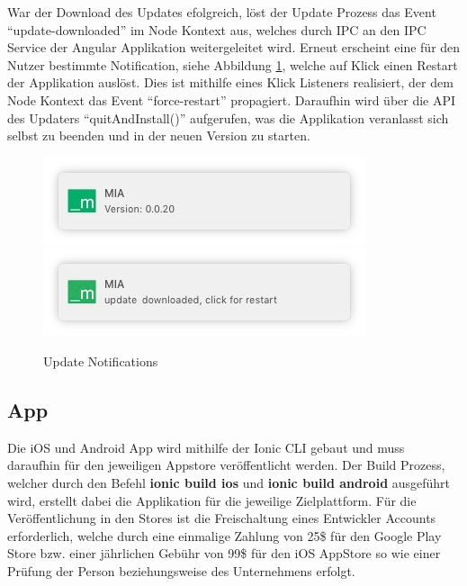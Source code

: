 War der Download des Updates efolgreich, löst der Update Prozess das Event ``update-downloaded'' im Node Kontext aus,
welches durch IPC an den IPC Service der Angular Applikation weitergeleitet wird. Erneut erscheint eine für den Nutzer bestimmte Notification, siehe Abbildung \ref{kapitel4/update-push}, welche auf Klick einen Restart der Applikation auslöst.
Dies ist mithilfe eines Klick Listeners realisiert, der dem Node Kontext das Event ``force-restart'' propagiert.
Daraufhin wird über die \ac{API} des Updaters ``quitAndInstall()'' aufgerufen, was die Applikation veranlasst sich selbst zu beenden und in der neuen Version zu starten.


\begin{figure}[h]
 \centering
  \includegraphics[width=0.5\linewidth]{kapitel4/version-push.jpg}
 \includegraphics[width=0.5\linewidth]{kapitel4/update-push.jpg}
 \caption{Update Notifications}
 \label{kapitel4/update-push}
\end{figure}
\vspace{0.3cm}


\subsection{App}

Die iOS und Android App wird mithilfe der Ionic \ac{CLI} gebaut und muss daraufhin für den
jeweiligen Appstore veröffentlicht werden. Der Build Prozess,
welcher durch den Befehl \textbf{ionic build ios} und \textbf{ionic build android} ausgeführt wird,
erstellt dabei die Applikation für die jeweilige Zielplattform.
Für die Veröffentlichung in den Stores ist die Freischaltung eines Entwickler Accounts erforderlich,
welche durch eine einmalige Zahlung von 25\$ für den Google Play Store bzw. einer jährlichen Gebühr von 99\$
für den iOS AppStore so wie einer Prüfung der Person beziehungsweise des Unternehmens erfolgt.
